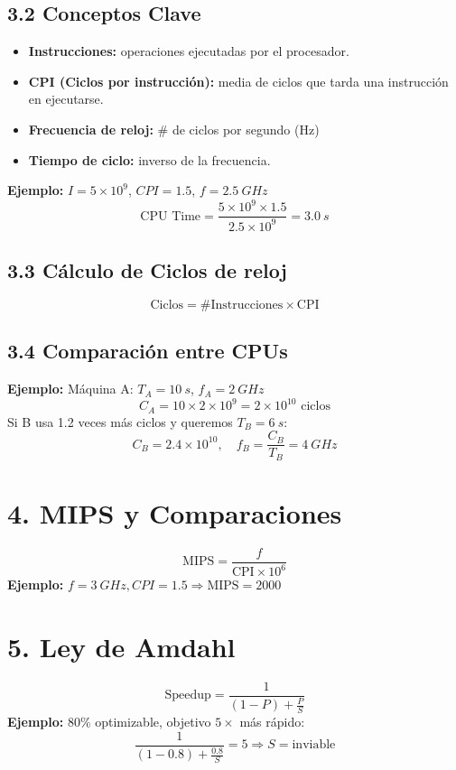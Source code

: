\documentclass[12pt]{article}
\begin{document}
\subsection*{3.2 Conceptos Clave}
\begin{itemize}
  \item \textbf{Instrucciones:} operaciones ejecutadas por el procesador.
  \item \textbf{CPI (Ciclos por instrucci\'on):} media de ciclos que tarda una instrucci\'on en ejecutarse.
  \item \textbf{Frecuencia de reloj:} \# de ciclos por segundo (\si{Hz})
  \item \textbf{Tiempo de ciclo:} inverso de la frecuencia.
\end{itemize}

\textbf{Ejemplo:} $I = 5 \times 10^9$, $CPI = 1.5$, $f = \SI{2.5}{GHz}$
\[ \text{CPU Time} = \frac{5 \times 10^9 \times 1.5}{2.5 \times 10^9} = 3.0~\si{s} \]

\subsection*{3.3 C\'alculo de Ciclos de reloj}
\[ \text{Ciclos} = \# \text{Instrucciones} \times \text{CPI} \]

\subsection*{3.4 Comparaci\'on entre CPUs}
\textbf{Ejemplo:} Máquina A: $T_A = 10~\si{s}$, $f_A = \SI{2}{GHz}$
\[ C_A = 10 \times 2 \times 10^9 = 2 \times 10^{10} \text{ ciclos} \]
Si B usa 1.2 veces más ciclos y queremos $T_B = 6~\si{s}$:
\[ C_B = 2.4 \times 10^{10}, \quad f_B = \frac{C_B}{T_B} = 4~\si{GHz} \]

\section*{4. MIPS y Comparaciones}
\[ \text{MIPS} = \frac{f}{\text{CPI} \times 10^6} \]
\textbf{Ejemplo:} $f = \SI{3}{GHz}, CPI = 1.5 \Rightarrow \text{MIPS} = 2000$

\section*{5. Ley de Amdahl}
\[ \text{Speedup} = \frac{1}{(1 - P) + \frac{P}{S}} \]
\textbf{Ejemplo:} 80\% optimizable, objetivo $5\times$ m\'as r\'apido:
\[ \frac{1}{(1 - 0.8) + \frac{0.8}{S}} = 5 \Rightarrow S = \text{inviable} \]
\end{document}
